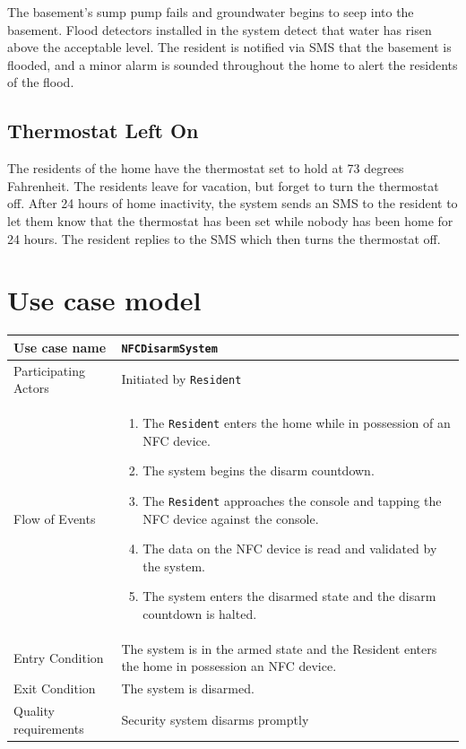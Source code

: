 \documentclass{report}
\begin{document}
The basement's sump pump fails and groundwater begins to seep into the
basement.  Flood detectors installed in the system detect that water has risen
above the acceptable level. The resident is notified via SMS that the basement
is flooded, and a minor alarm is sounded throughout the home to alert the
residents of the flood.

\subsection*{Thermostat Left On}

The residents of the home have the thermostat set to hold at 73 degrees
Fahrenheit.  The residents leave for vacation, but forget to turn the
thermostat off. After 24 hours of home inactivity, the system sends an SMS to
the resident to let them know that the thermostat has been set while nobody has
been home for 24 hours. The resident replies to the SMS which then turns the
thermostat off.

\section{Use case model}

\newlength{\originalParindent}
\setlength{\originalParindent}{\parindent}
\newlength{\originalParskip}
\setlength{\originalParskip}{\parskip}
\parindent 0pt
\parskip 10pt

\begin{tabular}{| l | p{12cm} |}
\hline
Use case name & \texttt{NFCDisarmSystem} \\ \hline
Participating Actors & Initiated by \texttt{Resident} \\ \hline
Flow of Events & 

\begin{enumerate}
 \item The \texttt{Resident} enters the home while in possession of an NFC 
        device.
 \item The system begins the disarm countdown.
 \item The \texttt{Resident} approaches the console and tapping the NFC device
       against the console.
 \item The data on the NFC device is read and validated by the system.
 \item The system enters the disarmed state and the disarm countdown is halted.
\end{enumerate}

\\ \hline

Entry Condition & The system is in the armed state and the Resident enters the
home in possession an NFC device. \\ \hline

Exit Condition & The system is disarmed. \\ \hline
Quality requirements & Security system disarms promptly \\ \hline

\hline
\end{tabular}
\end{document}
